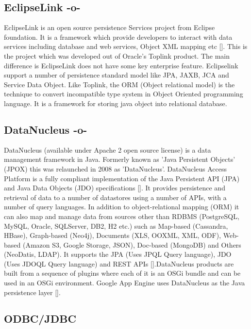\subsection{EclipseLink -o-}

EclipseLink is an open source persistence Services project from
Eclipse foundation. It is a framework which provide developers to
interact with data services including database and web services,
Object XML mapping etc [\cite{www-eclipselink}]. This is the project
which was developed out of Oracle's Toplink product. The main
difference is EclipseLink does not have some key enterprise
feature. Eclipselink support a number of persistence standard model
like JPA, JAXB, JCA and Service Data Object. Like Toplink, the ORM
(Object relational model) is the technique to convert incompatible
type system in Object Oriented programming language. It is a framework
for storing java object into relational database.


     
\subsection{DataNucleus -o-}

DataNucleus (available under Apache 2 open source license) is a data
management framework in Java. Formerly known as 'Java Persistent
Objects' (JPOX) this was relaunched in 2008 as
'DataNucleus'. DataNucleus Access Platform is a fully compliant
implementation of the Java Persistent API (JPA) and Java Data Objects
(JDO) specifications [\cite{www-DataNucleusWiki}]. It provides
persistence and retrieval of data to a number of datastores using a
number of APIs, with a number of query languages. In addition to
object-relational mapping (ORM) it can also map and manage data from
sources other than RDBMS (PostgreSQL, MySQL, Oracle, SQLServer, DB2,
H2 etc.) such as Map-based (Cassandra, HBase), Graph-based (Neo4j),
Documents (XLS, OOXML, XML, ODF), Web-based (Amazon S3, Google
Storage, JSON), Doc-based (MongoDB) and Others (NeoDatis, LDAP). It
supports the JPA (Uses JPQL Query language), JDO (Uses JDOQL Query
language) and REST APIs [\cite{www-DataNucleus}].DataNucleus products
are built from a sequence of plugins where each of it is an OSGi
bundle and can be used in an OSGi environment. Google App Engine uses
DataNucleus as the Java persistence
layer [\cite{www-DataNucleusPerformance}].


     
\subsection{ODBC/JDBC}

